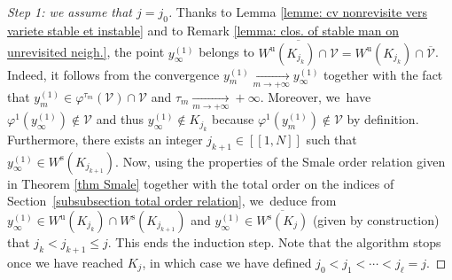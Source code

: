 \documentclass[11pt]{article}
\newcommand{\lcr}{[\![}
\newcommand{\rcr}{]\!]}
\newcommand{\rs}{\mathrm{s}}
\newcommand{\ru}{\mathrm{u}}
\theoremstyle{definition}
\theoremstyle{plain}
\newcommand{\Vcal}{\mathcal{V}}
\begin{document}
\begin{proof}[Step 1: we assume that $j = j_0$]
Thanks to Lemma \ref{lemme: cv nonrevisite vers variete stable et instable} and to Remark \ref{lemma: clos. of stable man on unrevisited neigh.}, the point $y_{\infty}^{(1)}$ belongs to $\overline{W^\ru (K_{j_k})\cap \Vcal} = W^\ru (K_{j_k})\cap \overline{\Vcal}$. Indeed, it follows from the convergence $y_m^{(1)} \underset{m \to +\infty}{\to} y_{\infty}^{(1)}$ together with the fact that $y_m^{(1)} \in \varphi^{\tau_m} (\Vcal) \cap \Vcal$ and $\tau_m \underset{m \to +\infty}{\to} +\infty$. Moreover, we~have $\varphi^{1} (y_{\infty}^{(1)}) \notin \Vcal$ and thus $y_{\infty}^{(1)} \notin K_{j_k}$ because $\varphi^1 (y_m^{(1)}) \notin \Vcal$ by definition. Furthermore, there exists an integer $ j_{k +1}\in\lcr1,N\rcr$ such that $y_{\infty}^{(1)} \in W^\rs (K_{j_{k+1}})$. Now, using the properties of the Smale order relation given in Theorem \ref{thm Smale} together with the total order on the indices of Section~\ref{subsubsection total order relation}, we~deduce from $y_{\infty}^{(1)} \in W^\ru (K_{j_{k}}) \cap W^\rs (K_{j_{k+1}})$ and $y_{\infty}^{(1)} \in \overline{W^\rs (K_j)}$ (given by construction) that $j_k < j_{k+1} \leq j$.
This ends the induction step. Note that the algorithm stops once we have reached $K_j$, in which case we have defined $j_0 < j_1 < \cdots < j_{\ell} = j$.


\end{proof}
\end{document}
